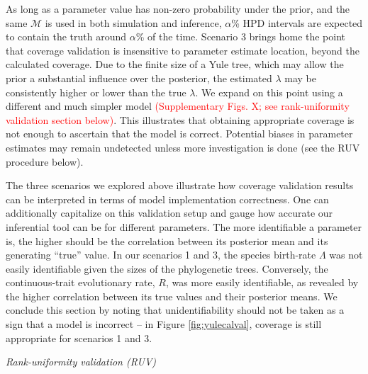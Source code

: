 \documentclass[oneside]{article}
\begin{document}
As long as a parameter value has non-zero probability under the prior, and the same $\mathcal{M}$ is used in both simulation and inference, $\alpha$\% HPD intervals are expected to contain the truth around $\alpha$\% of the time.
Scenario 3 brings home the point that coverage validation is insensitive to parameter estimate location, beyond the calculated coverage.
Due to the finite size of a Yule tree, which may allow the prior a substantial influence over the posterior, the estimated $\lambda$ may be consistently higher or lower than the true $\lambda$.
We expand on this point using a different and much simpler model \textcolor{red}{(Supplementary Figs. X; see rank-uniformity validation section below)}.
This illustrates that obtaining  appropriate coverage is not enough to ascertain that  the model is correct.
Potential biases in parameter estimates may remain undetected unless more investigation is done (see the RUV procedure below).

The three scenarios we explored above illustrate how coverage validation results can be interpreted in terms of model implementation correctness.
One can additionally capitalize on this validation setup and gauge how accurate our inferential tool can be for different parameters. 
The more identifiable a parameter is, the higher should be the correlation between its posterior mean and its generating ``true'' value.
In our scenarios 1 and 3, the species birth-rate $\Lambda$ was not easily identifiable given the sizes of the phylogenetic trees.
Conversely, the continuous-trait evolutionary rate, $R$, was more easily identifiable, as revealed by the higher correlation between its true values and their posterior means.
We conclude this section by noting that unidentifiability should not be taken as a sign that a model is incorrect -- in Figure \ref{fig:yulecalval}, coverage is still appropriate for scenarios 1 and 3.

\vspace{.25cm}

\noindent \emph{Rank-uniformity validation (RUV)}
\end{document}
